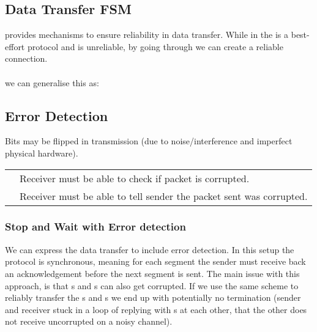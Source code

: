 \documentclass{report}
\begin{document}
\subsection*{Data Transfer FSM}
 provides mechanisms to ensure reliability in data transfer. While  in the  is a best-effort protocol and is unreliable, by going through  we can create a reliable connection.
\\
\\ we can generalise this as:

\subsection*{Error Detection}
Bits may be flipped in transmission (due to noise/interference and imperfect physical hardware).
\begin{center}
	\begin{tabular}{l p{}}
		\keyword{Error Detection}   & Receiver must be able to check if packet is corrupted.              \\
		\keyword{Receiver Feedback} & Receiver must be able to tell sender the packet sent was corrupted. \\
	\end{tabular}
\end{center}


\subsubsection*{Stop and Wait with Error detection}
We can express the data transfer  to include error detection. In this setup the protocol is synchronous, meaning for each segment the sender must receive back an acknowledgement before the next segment is sent.
The main issue with this approach, is that s and s can also get corrupted. If we use the same scheme to reliably transfer the s and s we end up with potentially no termination (sender and receiver stuck in a loop of replying with s at each other, that the other does not receive uncorrupted on a noisy channel).
\end{document}
